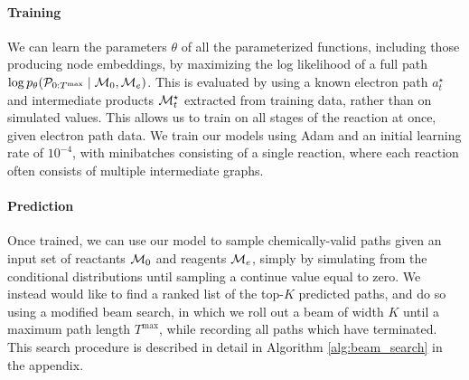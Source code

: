 \paragraph{Training}
We can learn the parameters $\theta$ of all the parameterized functions, including those producing node embeddings, by maximizing the log likelihood of a full path $\log p_\theta({\mathcal{P}}_{0:T^{\mathrm{max}}} \mid {\mathcal{M}}_0, {\mathcal{M}}_e)$.
This is evaluated by using a known electron path $a_t^\star$ and intermediate products ${\mathcal{M}}_t^\star$ extracted from training data,
rather than on simulated values. 
This allows us to train on all stages of the reaction at once, given electron path data.
We train our models using Adam \citep{kingma2014adam} and an initial learning rate of $10^{-4}$,
with minibatches consisting of a single reaction, where each reaction often consists of multiple intermediate graphs.

\paragraph{Prediction}
Once trained, we can use our model to sample chemically-valid paths given an input set of reactants ${\mathcal{M}}_0$ and reagents ${\mathcal{M}}_e$, 
simply by simulating from the conditional distributions until sampling a continue value equal to zero.
We instead would like to find a ranked list of the top-$K$ predicted paths, and do so using a modified beam search,
in which we roll out a beam of width $K$ until a maximum path length $T^\mathrm{max}$,
while recording all paths which have terminated.
This search procedure is described in detail in Algorithm \ref{alg:beam_search} in the appendix.



